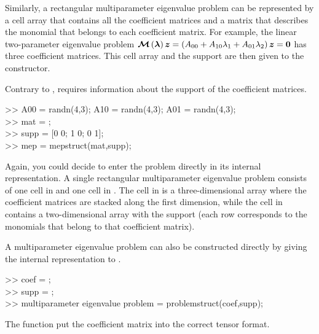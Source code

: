 \documentclass{manual}
\begin{document}
            Similarly, a rectangular multiparameter eigenvalue problem can be represented by a cell array that contains all the coefficient matrices and a matrix that describes the monomial that belongs to each coefficient matrix.
            For example, the linear two-parameter eigenvalue problem $\bm{\mathcal{M}} \left( \bm{\lambda} \right) \bm{z} = \left( A_{00} + A_{10} \lambda_1 + A_{01} \lambda_2 \right) \bm{z} = \bm{0}$ has three coefficient matrices.
            This cell array and the support are then given to the  constructor.
            \begin{code}
                Contrary to ,  requires information about the support of the coefficient matrices.
                \begin{codeblock}
                    >> A00 = randn(4,3); A10 = randn(4,3); A01 = randn(4,3); \\
                    >> mat = ; \\
                    >> supp = {[0 0; 1 0; 0 1]}; \\
                    >> mep = mepstruct(mat,supp);
                \end{codeblock}
            \end{code}
            Again, you could decide to enter the problem directly in its internal representation. 
            A single rectangular multiparameter eigenvalue problem consists of one cell in  and one cell in .
            The cell in  is a three-dimensional array where the coefficient matrices are stacked along the first dimension, while the cell in  contains a two-dimensional array with the support (each row corresponds to the monomials that belong to that coefficient matrix).
            \begin{code}
                A multiparameter eigenvalue problem can also be constructed directly by giving the internal representation to .
                \begin{codeblock}
                    >> coef = ; \\
                    >> supp = \string{{[}0 0; 1 0; 0 1{]}\string}; \\
                    >> multiparameter eigenvalue problem = problemstruct(coef,supp);
                \end{codeblock}
                \noindent The function  put the coefficient matrix into the correct tensor format.
            \end{code}
            
\end{document}
